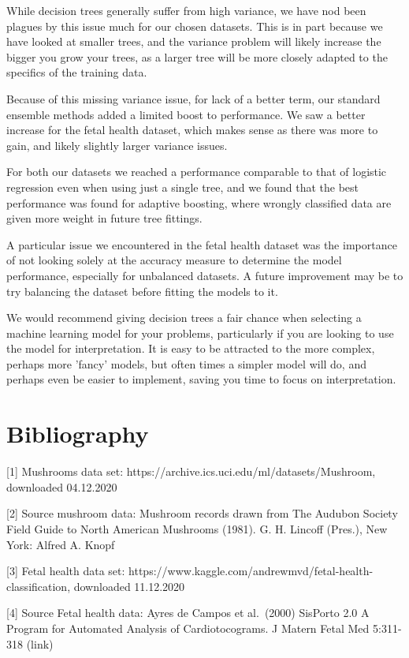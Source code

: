 \documentclass[11pt]{article}
\begin{document}
While decision trees generally suffer from high variance, we have nod been plagues by this issue much for our chosen datasets. This is in part because we have looked at smaller trees, and the variance problem will likely increase the bigger you grow your trees, as a larger tree will be more closely adapted to the specifics of the training data. 

Because of this missing variance issue, for lack of a better term, our standard ensemble methods added a limited boost to performance. We saw a better increase for the fetal health dataset, which makes sense as there was more to gain, and likely slightly larger variance issues. 

For both our datasets we reached a performance comparable to that of logistic regression even when using just a single tree, and we found that the best performance was found for adaptive boosting, where wrongly classified data are given more weight in future tree fittings.

A particular issue we encountered in the fetal health dataset was the importance of not looking solely at the accuracy measure to determine the model performance, especially for unbalanced datasets. A future improvement may be to try balancing the dataset before fitting the models to it.

We would recommend giving decision trees a fair chance when selecting a machine learning model for your problems, particularly if you are looking to use the model for interpretation. It is easy to be attracted to the more complex, perhaps more 'fancy' models, but often times a simpler model will do, and perhaps even be easier to implement, saving you time to focus on interpretation.


    \hypertarget{bibliography}{%
\section{Bibliography}\label{bibliography}}

{[}1{]} Mushrooms data set:
https://archive.ics.uci.edu/ml/datasets/Mushroom, downloaded 04.12.2020

{[}2{]} Source mushroom data: Mushroom records drawn from The Audubon
Society Field Guide to North American Mushrooms (1981). G. H. Lincoff
(Pres.), New York: Alfred A. Knopf

{[}3{]} Fetal health data set:
https://www.kaggle.com/andrewmvd/fetal-health-classification, downloaded
11.12.2020

{[}4{]} Source Fetal health data: Ayres de Campos et al.~(2000) SisPorto
2.0 A Program for Automated Analysis of Cardiotocograms. J Matern Fetal
Med 5:311-318 (link)
\end{document}
